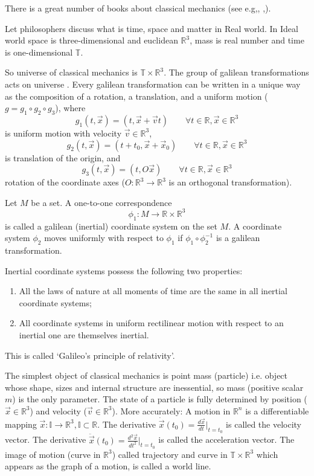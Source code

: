 There is a great number of books about classical mechanics 
(see e.g\cite{Arnold-cm},\cite{Landau-Lifshitz-1},
\cite{Lanczos},\cite{Goldstein}). 

Let philosophers discuss what is time, space and matter in Real world. 
In Ideal world space is three-dimensional  and euclidean $\mathbb{R}^3$,
mass is real number and time is one-dimensional $\mathbb{T}$.

So universe of classical mechanics is $\mathbb{T} \times \mathbb{R}^3$. 
 The  group of galilean transformations acts on universe \cite{Arnold-cm}. 
Every galilean transformation can be written in a unique way as the composition of a rotation, a translation,
and a uniform motion ($g = g_1 \circ g_2 \circ g_3$), where
\[g_1(t,\vec x)=(t,\vec x+\vec v t)\qquad \forall t\in \mathbb{R},\vec x \in\mathbb{R}^3\] is uniform motion with velocity $\vec v \in\mathbb{R}^3$,
\[g_2(t,\vec x)=(t+t_0,\vec x+\vec x_0)\qquad \forall t\in \mathbb{R},\vec x \in\mathbb{R}^3\] is translation of the origin, and
\[g_3(t,\vec x)=(t,O\vec x)\qquad \forall t\in \mathbb{R},\vec x \in\mathbb{R}^3\] rotation of the coordinate axes ($O:\mathbb{R}^3 \rightarrow \mathbb{R}^3$ is an orthogonal transformation).

Let $M$ be a set. A one-to-one correspondence 
\[\phi_1: M \rightarrow \mathbb{R} \times \mathbb{R}^3\]
is called a galilean (inertial) coordinate system on the set $M$. A coordinate system $\phi_2$ moves
uniformly with respect to $\phi_1$  if $\phi_1\circ\phi_2^{-1}$ is a galilean
transformation. 

Inertial coordinate systems  possess the following two properties:
\begin{enumerate}
    \item All the laws of nature at all moments of time are the same in all inertial coordinate systems;
    \item  All coordinate systems in uniform rectilinear motion with respect to an inertial one are themselves inertial.
\end{enumerate}
This is called `Galileo's principle of relativity'.

The simplest object of classical mechanics is point mass (particle) i.e. object whose shape, 
sizes and internal structure are inessential, so mass (positive scalar $m$) is the only parameter. 
The state of a particle is fully determined by position ($\vec x \in\mathbb{R}^3$) 
and velocity ($\vec v \in\mathbb{R}^3$). 
More accurately: A motion in $\mathbb{R}^n$ is a differentiable mapping 
$\vec x: \mathbb{I}\rightarrow \mathbb{R}^3, \mathbb{I} \subset \mathbb{R}$. 
The derivative $\dot \vec{x}(t_0)=\frac{d\vec x}{dt}|_{t=t_0}$ is called the velocity vector. 
The derivative $\ddot \vec x(t_0)=\frac{ d^2 \vec x}{dt^2}|_{t=t_0}$ is called the acceleration vector. 
The image of motion (curve in $\mathbb{R}^3$) called trajectory and  curve in 
$\mathbb{T} \times \mathbb{R}^3$ which appears  as the graph of a motion, is called a world line.

